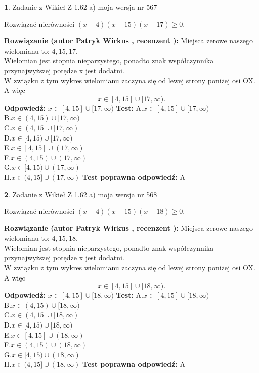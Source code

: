 \documentclass[12pt, a4paper]{article}
\theoremstyle{definition} %
\newtheorem{zad}{}
\newcommand{\zadStart}[1]{\begin{zad}#1\newline}
\newcommand{\zadStop}{\end{zad}}
\newcommand{\rozwStart}[2]{\noindent \textbf{Rozwiązanie (autor #1 , recenzent #2): }\newline}
\newcommand{\rozwStop}{\newline}
\newcommand{\odpStart}{\noindent \textbf{Odpowiedź:}\newline}
\newcommand{\odpStop}{\newline}
\newcommand{\testStart}{\noindent \textbf{Test:}\newline}
\newcommand{\testStop}{\newline}
\newcommand{\kluczStart}{\noindent \textbf{Test poprawna odpowiedź:}\newline}
\newcommand{\kluczStop}{\newline}
\begin{document}
\zadStart{Zadanie z Wikieł Z 1.62 a) moja wersja nr 567}

Rozwiązać nierówności $(x-4)(x-15)(x-17)\ge0$.
\zadStop
\rozwStart{Patryk Wirkus}{}
Miejsca zerowe naszego wielomianu to: $4, 15, 17$.\\
Wielomian jest stopnia nieparzystego, ponadto znak współczynnika przy\linebreak najwyższej potędze x jest dodatni.\\ W związku z tym wykres wielomianu zaczyna się od lewej strony poniżej osi OX. A więc $$x \in [4,15] \cup [17,\infty).$$
\rozwStop
\odpStart
$x \in [4,15] \cup [17,\infty)$
\odpStop
\testStart
A.$x \in [4,15] \cup [17,\infty)$\\
B.$x \in (4,15) \cup [17,\infty)$\\
C.$x \in (4,15] \cup [17,\infty)$\\
D.$x \in [4,15) \cup [17,\infty)$\\
E.$x \in [4,15] \cup (17,\infty)$\\
F.$x \in (4,15) \cup (17,\infty)$\\
G.$x \in [4,15) \cup (17,\infty)$\\
H.$x \in (4,15] \cup (17,\infty)$
\testStop
\kluczStart
A
\kluczStop



\zadStart{Zadanie z Wikieł Z 1.62 a) moja wersja nr 568}

Rozwiązać nierówności $(x-4)(x-15)(x-18)\ge0$.
\zadStop
\rozwStart{Patryk Wirkus}{}
Miejsca zerowe naszego wielomianu to: $4, 15, 18$.\\
Wielomian jest stopnia nieparzystego, ponadto znak współczynnika przy\linebreak najwyższej potędze x jest dodatni.\\ W związku z tym wykres wielomianu zaczyna się od lewej strony poniżej osi OX. A więc $$x \in [4,15] \cup [18,\infty).$$
\rozwStop
\odpStart
$x \in [4,15] \cup [18,\infty)$
\odpStop
\testStart
A.$x \in [4,15] \cup [18,\infty)$\\
B.$x \in (4,15) \cup [18,\infty)$\\
C.$x \in (4,15] \cup [18,\infty)$\\
D.$x \in [4,15) \cup [18,\infty)$\\
E.$x \in [4,15] \cup (18,\infty)$\\
F.$x \in (4,15) \cup (18,\infty)$\\
G.$x \in [4,15) \cup (18,\infty)$\\
H.$x \in (4,15] \cup (18,\infty)$
\testStop
\kluczStart
A
\kluczStop
\end{document}
